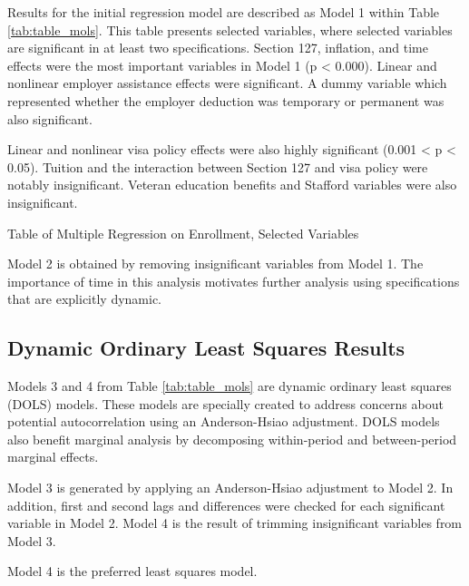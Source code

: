 \documentclass[review]{elsarticle}
\begin{document}
Results for the initial regression model are described as Model 1 within Table \ref{tab:table_mols}.
This table presents selected variables, where selected variables are significant in at least two specifications.
Section 127, inflation, and time effects were the most important variables in Model 1 (p < 0.000).
Linear and nonlinear employer assistance effects were significant.
A dummy variable which represented whether the employer deduction was temporary or permanent was also significant.

Linear and nonlinear visa policy effects were also highly significant (0.001 < p < 0.05).
Tuition and the interaction between Section 127 and visa policy were notably insignificant.
Veteran education benefits and Stafford variables were also insignificant.

\begin{table}
    \caption{Table of Multiple Regression on Enrollment, Selected Variables}
    \resizebox{\columnwidth}{!}{
        
    }
    \label{tab:table_mols}
\end{table}

Model 2 is obtained by removing insignificant variables from Model 1.
The importance of time in this analysis motivates further analysis using specifications that are explicitly dynamic.

\subsection{Dynamic Ordinary Least Squares Results}

Models 3 and 4 from Table \ref{tab:table_mols} are dynamic ordinary least squares (DOLS) models.
These models are specially created to address concerns about potential autocorrelation using an Anderson-Hsiao adjustment\cite{anderson1981estimation}.
DOLS models also benefit marginal analysis by decomposing within-period and between-period marginal effects.

Model 3 is generated by applying an Anderson-Hsiao adjustment to Model 2.
In addition, first and second lags and differences were checked for each significant variable in Model 2.
Model 4 is the result of trimming insignificant variables from Model 3.

Model 4 is the preferred least squares model.
\end{document}
